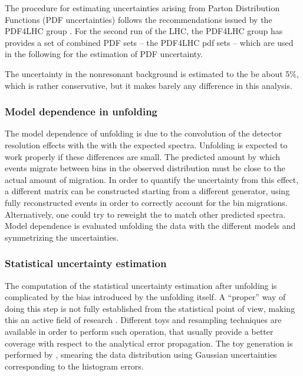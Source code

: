 The procedure for estimating uncertainties arising from Parton
Distribution Functions (PDF uncertainties) follows the recommendations
issued by the PDF4LHC group \cite{Butterworth:2015oua}.
For the second run of the LHC, the PDF4LHC group has provides a set of combined
PDF sets -- the PDF4LHC pdf sets -- which are used in the following for the estimation
of PDF uncertainty.

The uncertainty in the nonresonant background is estimated to the be 
about 5\%, which is rather conservative, but it makes barely any difference in
this analysis.

\subsubsection{Model dependence in unfolding}

The model dependence of unfolding is due to the convolution of the detector resolution effects with the
with the expected spectra.
Unfolding is expected to work properly if these differences are small.
The predicted amount by which events migrate between bins in the observed distribution must be close to the actual amount of migration.
In order to quantify the uncertainty from this effect,
a different matrix can be constructed starting from a different \MC{} generator,
using fully reconstructed events in order to correctly account for 
the bin migrations. Alternatively, one could try to reweight the \MC{} to 
match other predicted spectra. 
Model dependence is evaluated unfolding the data with the different models and 
symmetrizing the uncertainties.

\subsubsection{Statistical uncertainty estimation}

The computation of the statistical uncertainty estimation after unfolding is 
complicated by the bias introduced by the unfolding itself. A ``proper'' way 
of doing this step is not fully established from the statistical point of view, 
making this an active field of research \cite{Prosper:2011zz,kuusela}.
Different toys and resampling techniques are available in order to perform such 
operation, that usually provide a better coverage with respect to the analytical 
error propagation. The toy generation is performed by \RooUnfold{}, smearing the 
data distribution using Gaussian uncertainties corresponding to the histogram 
errors.

